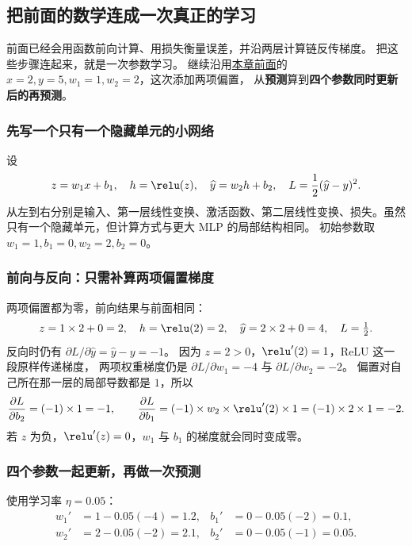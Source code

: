 \subsection{把前面的数学连成一次真正的学习}
\label{sec:end-to-end-step}

前面已经会用函数前向计算、用损失衡量误差，并沿两层计算链反传梯度。
把这些步骤连起来，就是一次参数学习。
继续沿用\hyperref[sec:backprop-weight-gradients]{本章前面}的 $x=2,y=5,w_1=1,w_2=2$，这次添加两项偏置，
从\textbf{预测}算到\textbf{四个参数同时更新后的再预测}。

\subsubsection{先写一个只有一个隐藏单元的小网络}

设
\begin{equation}
z=w_1x+b_1,\quad h=\relu(z),\quad
\widehat{y}=w_2h+b_2,\quad
L=\frac12(\widehat{y}-y)^2.
\label{eq:small-network-full}
\end{equation}
从左到右分别是输入、第一层线性变换、激活函数、第二层线性变换、损失。虽然只有一个隐藏单元，但计算方式与更大 MLP 的局部结构相同。
初始参数取 $w_1=1,b_1=0,w_2=2,b_2=0$。

\subsubsection{前向与反向：只需补算两项偏置梯度}

两项偏置都为零，前向结果与前面相同：
\[
z=1\times2+0=2,\quad h=\relu(2)=2,\quad
\widehat{y}=2\times2+0=4,\quad L=\tfrac12.
\]
反向时仍有 $\partial L/\partial\widehat{y}=\widehat{y}-y=-1$。
因为 $z=2>0$，$\relu'(2)=1$，ReLU 这一段原样传递梯度，
两项权重梯度仍是 $\partial L/\partial w_1=-4$ 与 $\partial L/\partial w_2=-2$。
偏置对自己所在那一层的局部导数都是 $1$，所以
\[
\frac{\partial L}{\partial b_2}=(-1)\times1=-1,\qquad
\frac{\partial L}{\partial b_1}=(-1)\times w_2\times\relu'(2)\times1=(-1)\times2\times1=-2.
\]
若 $z$ 为负，$\relu'(z)=0$，$w_1$ 与 $b_1$ 的梯度就会同时变成零。

\subsubsection{四个参数一起更新，再做一次预测}

使用学习率 $\eta=0.05$：
\[\begin{aligned}
w_1'&=1-0.05(-4)=1.2,&
b_1'&=0-0.05(-2)=0.1,\\
w_2'&=2-0.05(-2)=2.1,&
b_2'&=0-0.05(-1)=0.05.
\end{aligned}\]

